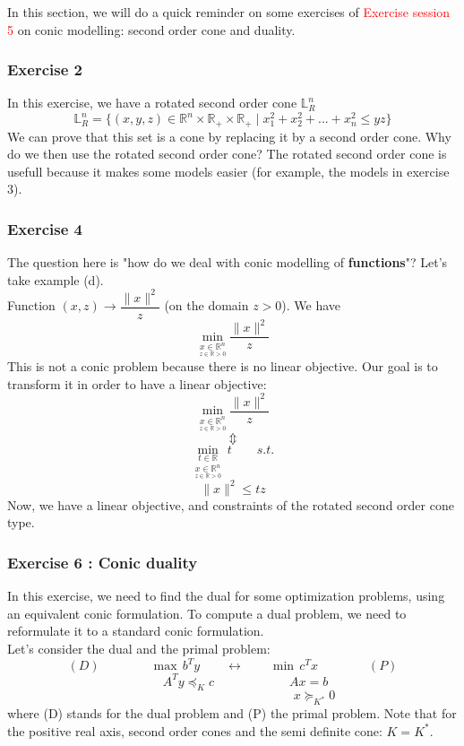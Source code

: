 In this section, we will do a quick reminder on some exercises of \textcolor{red}{Exercise session 5} on conic modelling: second order cone and duality. 

\subsubsection{Exercise 2}
In this exercise, we have a rotated second order cone $\mathbb{L}^n_R $
$$\mathbb{L}^n_R=\{(x,y,z)\in \mathbb{R}^n\times \mathbb{R}_+ \times \mathbb{R}_+ \mid x_1^2+x_2^2+...+x_n^2 \leq yz \}$$ 
We can prove that this set is a cone by replacing it by a second order cone. Why do we then use the rotated second order cone? The rotated second order cone is usefull because it makes some models easier (for example, the models in exercise 3). 

\subsubsection{Exercise 4}
The question here is "how do we deal with conic modelling of \textbf{functions}"? Let's take example (d). \\
Function $(x,z)\rightarrow \dfrac{\parallel x \parallel^2}{z}$ (on the domain $z>0$). We have $$\underset{\underset{z\in \mathbb{R}>0}{x\in \mathbb{R}^n}}\min \dfrac{\parallel x \parallel^2}{z}$$
This is not a conic problem because there is no linear objective. Our goal is to transform it in order to have a linear objective:
$$\underset{\underset{z\in \mathbb{R}>0}{x\in \mathbb{R}^n}}\min \dfrac{\parallel x \parallel^2}{z}$$
$$\Updownarrow$$
$$\underset{\underset{z\in \mathbb{R}>0}{x\in \mathbb{R}^n}}{\underset{t\in\mathbb{R}}\min}\ t\qquad s.t.$$
$$\parallel x \parallel^2 \leq tz$$
Now, we have a linear objective, and constraints of the rotated second order cone type.

\subsubsection{Exercise 6 : Conic duality}
In this exercise, we need to find the dual for some optimization problems, using an equivalent conic formulation. To compute a dual problem, we need to reformulate it to a standard conic formulation.\\
Let's consider the dual and the primal problem: 
$$(D)\qquad \qquad \max \, b^Ty \qquad \longleftrightarrow \qquad \min \, c^Tx \qquad \qquad (P)$$ 
$$ \qquad A^Ty \preceq_K c \qquad \qquad \qquad Ax=b$$
$$ \qquad \qquad \qquad \qquad \qquad \qquad \quad x\succeq_{K^*}0$$
where (D) stands for the dual problem and (P) the primal problem. 
Note that for the positive real axis, second order cones and the semi definite cone: $K=K^*$.

